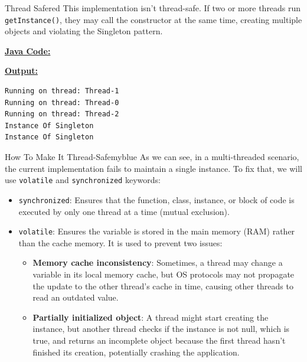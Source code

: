 \vspace{0.5cm}

\begin{prettyBox}{Thread Safe}{red}
This implementation isn't thread-safe. If two or more threads  
run \texttt{getInstance()}, they may call the constructor at the same time,  
creating multiple objects and violating the Singleton pattern.
\end{prettyBox}

\newpage

\textbf{\underline{Java Code:}}


\vspace{0.5cm}

\textbf{\underline{Output:}}
\begin{lstlisting}[style=cmd]
Running on thread: Thread-1
Running on thread: Thread-0
Running on thread: Thread-2
Instance Of Singleton
Instance Of Singleton
\end{lstlisting}

\vspace{1cm}
\begin{prettyBox}{How To Make It Thread-Safe}{myblue}
As we can see, in a multi-threaded scenario, the current implementation
fails to maintain a single instance. To fix that, we will use 
\texttt{volatile} and \texttt{synchronized} keywords:
\begin{itemize}
    \item \texttt{synchronized}: Ensures that the function, class, instance,
        or block of code is executed by only one thread at a time (mutual exclusion).
    \item \texttt{volatile}: Ensures the variable is stored in the main memory
        (RAM) rather than the cache memory. It is used to prevent two issues:
        \begin{itemize}
            \item \textbf{Memory cache inconsistency}: Sometimes, a thread may change a variable in its
                local memory cache, but OS protocols may not propagate the update to the other 
                thread’s cache in time, causing other threads to read an outdated value.
        \item \textbf{Partially initialized object}: A thread might start creating the instance, 
                but another thread checks if the instance is not null, which is true, and 
                returns an incomplete object because the first thread hasn’t finished its creation, 
                potentially crashing the application.
        \end{itemize}
\end{itemize}
\end{prettyBox}


